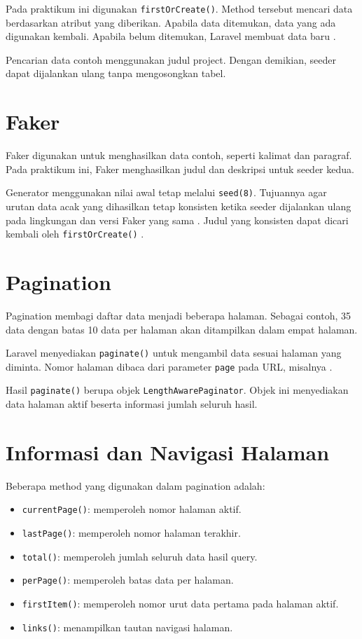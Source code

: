 \documentclass[a4paper,oneside,11pt]{book}
\renewcommand{\_}{\textunderscore\allowbreak{}}
\begin{document}
Pada praktikum ini digunakan \texttt{firstOrCreate()}.
Method tersebut mencari data berdasarkan atribut yang diberikan.
Apabila data ditemukan, data yang ada digunakan kembali. Apabila belum
ditemukan, Laravel membuat data baru \cite{laravel-eloquent}.

Pencarian data contoh menggunakan judul project. Dengan demikian,
seeder dapat dijalankan ulang tanpa mengosongkan tabel.

\section{Faker}

Faker digunakan untuk menghasilkan data contoh, seperti kalimat dan
paragraf. Pada praktikum ini, Faker menghasilkan judul dan deskripsi
untuk seeder kedua.

Generator menggunakan nilai awal tetap melalui \texttt{seed(8)}.
Tujuannya agar urutan data acak yang dihasilkan tetap konsisten ketika
seeder dijalankan ulang pada lingkungan dan versi Faker yang sama \cite{faker}.
Judul yang konsisten dapat dicari kembali oleh
\texttt{firstOrCreate()} \cite{laravel-eloquent}.

\section{Pagination}

Pagination membagi daftar data menjadi beberapa halaman.
Sebagai contoh, 35 data dengan batas 10 data per halaman akan
ditampilkan dalam empat halaman.

Laravel menyediakan \texttt{paginate()} untuk mengambil data sesuai
halaman yang diminta. Nomor halaman dibaca dari parameter
\texttt{page} pada URL, misalnya  \cite{laravel-pagination}.

Hasil \texttt{paginate()} berupa objek
\texttt{LengthAwarePaginator}. Objek ini menyediakan data halaman aktif
beserta informasi jumlah seluruh hasil.

\section{Informasi dan Navigasi Halaman}

Beberapa method yang digunakan dalam pagination adalah:

\begin{itemize}
    \item \texttt{currentPage()}: memperoleh nomor halaman aktif.
    \item \texttt{lastPage()}: memperoleh nomor halaman terakhir.
    \item \texttt{total()}: memperoleh jumlah seluruh data hasil query.
    \item \texttt{perPage()}: memperoleh batas data per halaman.
    \item \texttt{firstItem()}: memperoleh nomor urut data pertama pada halaman aktif.
    \item \texttt{links()}: menampilkan tautan navigasi halaman.
\end{itemize}
\end{document}
